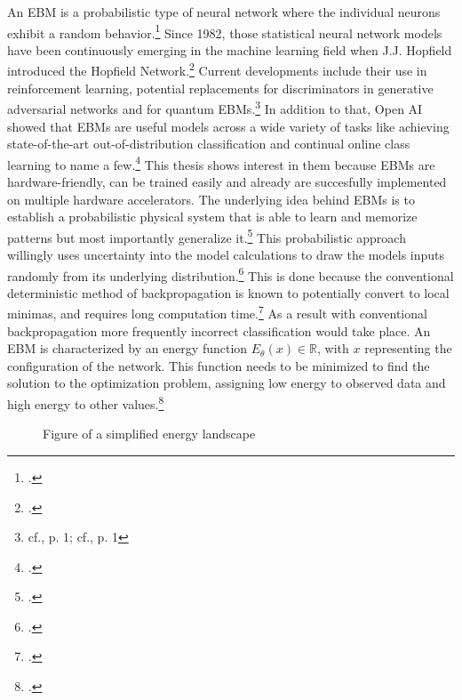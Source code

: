 An \ac{EBM} is a probabilistic type of neural network where the individual neurons exhibit a random behavior.\footcite[cf.][2]{huembeliPhysicsEnergybasedModels2022}
Since 1982, those statistical neural network models have been continuously emerging in the machine learning field when J.J. Hopfield introduced the Hopfield Network.\footcite[cf.][]{hopfieldNeuralNetworksPhysical1982}
Current developments include their use in reinforcement learning, potential replacements for discriminators in generative adversarial networks and for quantum \ac{EBM}s.\footnote{cf.\cite{verdonQuantumHamiltonianBasedModels2019}, p. 1; cf.\cite{duModelBasedPlanning2021}, p. 1}
In addition to that, Open AI showed that \ac{EBM}s are useful models across a wide variety of tasks like achieving state-of-the-art out-of-distribution classification and continual online class learning to name a few.\footcite[cf.][1-2]{duImplicitGenerationGeneralization2020}
This thesis shows interest in them because \ac{EBM}s are hardware-friendly, can be trained easily and already are succesfully implemented on multiple hardware accelerators.
The underlying idea behind \ac{EBM}s is to establish a probabilistic physical system that is able to learn and memorize patterns but most importantly generalize it.\footcite[cf.][2]{huembeliPhysicsEnergybasedModels2022} 
This probabilistic approach willingly uses uncertainty into the model calculations to draw the models inputs randomly from its underlying distribution.\footcite[cf.][25-27]{uusitaloOverviewMethodsEvaluate2015}
This is done because the conventional deterministic method of backpropagation is known to potentially convert to local minimas, and requires long computation time.\footcite[cf.][109]{spechtProbabilisticNeuralNetworks1990}
As a result with conventional backpropagation more frequently incorrect classification would take place.
An \ac{EBM} is characterized by an energy function \(E_{\theta}(x) \in \mathbb{R}\), with \( x \) representing the configuration of the network. This function needs to be minimized to find the solution to the optimization problem, assigning low energy to observed data and high energy to other values.\footcite[cf.][330]{gustafssonEnergyBasedModelsDeep2020}
\begin{figure}[H]
    \centering
    \caption{Figure of a simplified energy landscape}
    \label{energy_landscape_1}
\end{figure}
